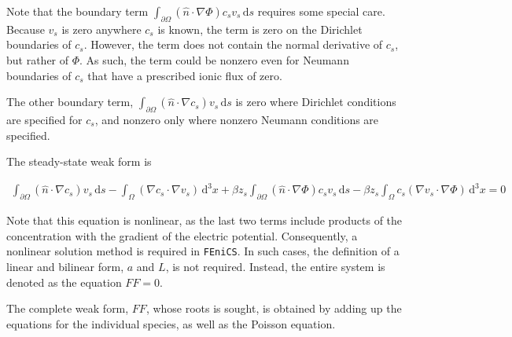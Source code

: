 Note that the boundary term
$\int_{\partial\Omega} \left( \hat{n} \cdot \nabla \Phi \right) c_s v_s \,\mathrm{d}s$
requires some special care.
Because $v_s$ is zero anywhere $c_s$ is known,
the term is zero on the Dirichlet boundaries of $c_s$.
However, the term does not contain the normal derivative of $c_s$,
but rather of $\Phi$.
As such, the term could be nonzero even for Neumann boundaries of $c_s$
that have a prescribed ionic flux of zero.

The other boundary term, $\int_{\partial\Omega} \left( \hat{n} \cdot \nabla c_s \right) v_s \,\mathrm{d}s$
is zero where Dirichlet conditions are specified for $c_s$,
and nonzero only where nonzero Neumann conditions are specified.

The steady-state weak form is

\begin{equation}
  \boxed{
    \begin{aligned}
      \int_{\partial\Omega} \left( \hat{n} \cdot \nabla c_s \right) v_s \,\mathrm{d}s
      - \int_\Omega \left( \nabla c_s \cdot \nabla v_s \right) \,\mathrm{d}^3x 
      + \beta z_s \int_{\partial\Omega} \left( \hat{n} \cdot \nabla \Phi \right) c_s v_s \,\mathrm{d}s
      - \beta z_s \int_\Omega c_s  \left( \nabla v_s \cdot \nabla \Phi \right) \,\mathrm{d}^3x
       = 0
    \end{aligned}
  }
\end{equation}

Note that this equation is nonlinear, as the last two terms include products of the concentration
with the gradient of the electric potential.
Consequently, a nonlinear solution method is required in \texttt{FEniCS}.
In such cases, the definition of a linear and bilinear form, $a$ and $L$,
is not required.
Instead, the entire system is denoted as the equation $FF = 0$.

The complete weak form, $FF$, whose roots is sought, is obtained by adding up the equations for the individual species,
as well as the Poisson equation.

